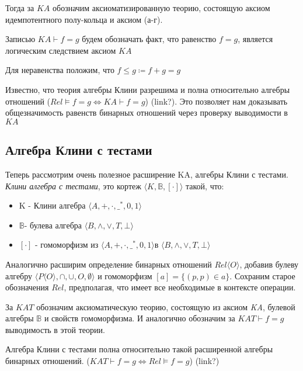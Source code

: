 \documentclass[times
              ]{itmo-student-thesis}
\begin{document}
      Тогда за $ \mathit{KA} $ обозначим аксиоматизированную теорию, состоящую аксиом идемпотентного полу-кольца и аксиом (а-г). %

      Записью $ \mathit{KA} \vdash f = g $ будем обозначать факт, что равенство $ f = g $, является логическим следствием аксиом $ \mathit{KA} $

      Для неравенства положим, что $ f \leq g \coloneqq f + g = g$

      Известно, что теория алгебры Клини разрешима и полна относительно алгебры отношений
      ($ Rel \models f = g \Leftrightarrow \mathit{KA} \vdash f = g$) (link?).
      Это позволяет нам доказывать общезначимость равенств бинарных отношений через проверку выводимости в $ \mathit{KA} $

    \subsection{Алгебра Клини с тестами}
      Теперь рассмотрим очень полезное расширение KA, алгебры Клини с тестами.
      \textit{Клини алгебра с тестами}, это кортеж $\langle K,\mathbb{B}, [\cdot] \rangle$ такой, что:

      \begin{itemize}
        \item K - Клини алгебра $\langle A, +, \cdot, \_^*, 0, 1 \rangle $
        \item $ \mathbb{B}  $- булева алгебра $\langle B, \wedge, \vee, T, \bot \rangle $
        \item $ [\cdot] $ - гомоморфизм из $\langle A, +, \cdot, \_^*, 0, 1 \rangle  $в $\langle B, \wedge, \vee, T, \bot \rangle$
      \end{itemize}

      Аналогично расширим определение бинарных отношений $Rel \langle O \rangle $, добавив булеву алгебру $\langle P\langle O \rangle, \cap, \cup, O, \emptyset \rangle$ и гомоморфизм $ [a] = \{(p, p) \in a\} $. Сохраним старое обозначения $ \mathit{Rel} $, предполагая, что имеет все необходимые в контексте операции.

      За $ \mathit{KAT} $ обозначим аксиоматическую теорию, состоящую из аксиом \textit{KA}, булевой алгебры $ \mathbb{B}$ и свойств гомоморфизма. И аналогично обозначим за $ KAT \vdash f = g $ выводимость в этой теории.

      Алгебра Клини с тестами полна относительно такой расширенной алгебры бинарных отношений.
      ($\mathit{KAT} \vdash f = g \Leftrightarrow \mathit{Rel} \models f = g$) (link?)
\end{document}
